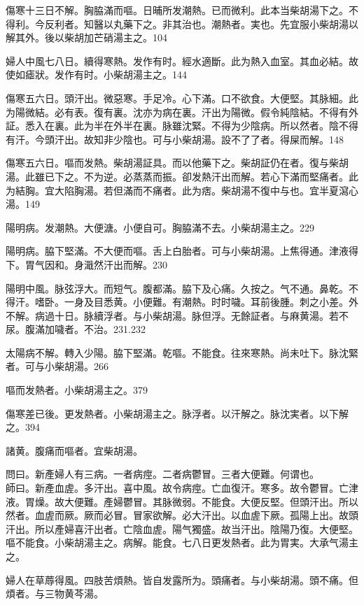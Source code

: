\documentclass[b5paper,twoside,zihao=-4,UTF8]{ctexbook}
\begin{document}
傷寒十三日不解。胸脇滿而嘔。日晡所发潮熱{。已}而微利。此本当柴胡湯下之。不得利。今反利者。知醫以丸藥下之。非其治也。潮熱者。実也。先宜服小柴胡湯以解其外。後以柴胡加芒硝湯主之。104

婦人中風七八日。續得寒熱。发作有时。經水適斷。此为熱入血室。其血必結。故使如瘧狀。发作有时。小柴胡湯主之。144

傷寒五六日。頭汗出。微惡寒。手足冷。心下滿。口不欲食。大便堅。其脉細。此为陽微結。必有表。復有裏。沈亦为病在裏。汗出为陽微。假令純陰結。不得有外証。悉入在裏。此为半在外半在裏。脉雖沈緊。不得为少陰病。所以然者。陰不得有汗。今頭汗出。故知非少陰也。可与{小}柴胡湯。設不了了者。得屎而解。148

傷寒五六日。嘔而发熱。柴胡湯証具。而以他藥下之。柴胡証仍在者。復与柴胡湯。此雖已下之。不为逆。必蒸蒸而振。卻发熱汗出而解。若心下滿而堅痛者。此为結胸。宜大陷胸湯。若但滿而不痛者。此为痞。柴胡{湯}不復中与也。宜半夏瀉心湯。149

陽明病。发潮熱。大便溏。小便自可。胸脇滿不去。小柴胡湯主之。229

陽明病。脇下堅滿。不大便而嘔。舌上白胎者。可与小柴胡湯。上焦得通。津液得下。胃气因和。身濈然汗出而解。230

陽明中風。脉弦浮大。而短气。腹都滿。脇下及心痛。久按之。气不通。鼻乾。不得汗。嗜卧。一身及目悉黄。小便難。有潮熱。时时噦。耳前後腫。刺之小差。外不解。病過十日。脉續浮者。与{小}柴胡湯。脉但浮。无餘証者。与麻黄湯。若不尿。腹滿加噦者。不治。231.232

太陽病不解。轉入少陽。脇下堅滿。乾嘔。不能食。往來寒熱。尚未吐下。脉沈緊者。可与小柴胡湯。266

嘔而发熱者。小柴胡湯主之。379

傷寒差已後。更发熱者。小柴胡湯主之。脉浮者。以汗解之。脉沈実者。以下解之。394

諸黄。腹痛而嘔者。宜柴胡湯。

問曰。新產婦人有三病。一者病痙。二者病鬱冒。三者大便難。何谓也。\\
師曰。新產血虗。多汗出。喜中風。故令病痙。亡血復汗。寒多。故令鬱冒。亡津液。胃燥。故大便難。產婦鬱冒。其脉微弱。不能食。大便反堅。但頭汗出。所以然者。血虗而厥。厥而必冒。冒家欲解。必大汗出。以血虗下厥。孤陽上出。故頭汗出。所以產婦喜汗出者。亡陰血虗。陽气獨盛。故当汗出。陰陽乃復。大便堅。嘔不能食。小柴胡湯主之。病解。能食。七八日更发熱者。此为胃実。大承气湯主之。

婦人在草蓐得風。四肢苦煩熱。皆自发露所为。頭痛者。与小柴胡湯。頭不痛。但煩者。与三物黄芩湯。
\end{document}
